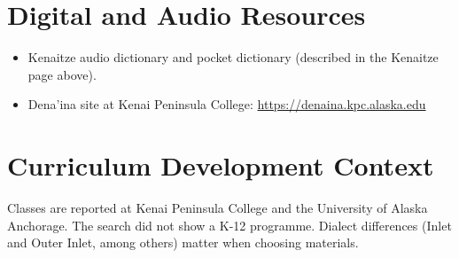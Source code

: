 \documentclass[12pt]{article}
\begin{document}
\section{Digital and Audio Resources}
\begin{itemize}
\item Kenaitze audio dictionary and pocket dictionary (described in the Kenaitze page above).
\item Dena'ina site at Kenai Peninsula College: \url{https://denaina.kpc.alaska.edu}
\end{itemize}
\section{Curriculum Development Context}
Classes are reported at Kenai Peninsula College and the University of Alaska Anchorage. The search did not show a K-12 programme. Dialect differences (Inlet and Outer Inlet, among others) matter when choosing materials.
\end{document}
